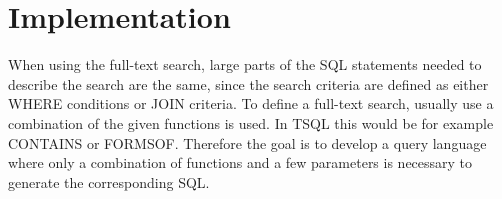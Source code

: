 \newpage
\section{Implementation}
When using the full-text search, large parts of the SQL statements needed to describe the search are the same, since the search criteria are defined as either WHERE conditions or JOIN criteria. To define a full-text search, usually use a combination of the given functions is used. In \ac{TSQL} this would be for example CONTAINS or FORMSOF. Therefore the goal is to develop a query language where only a combination of functions and a few parameters is necessary to generate the corresponding SQL.